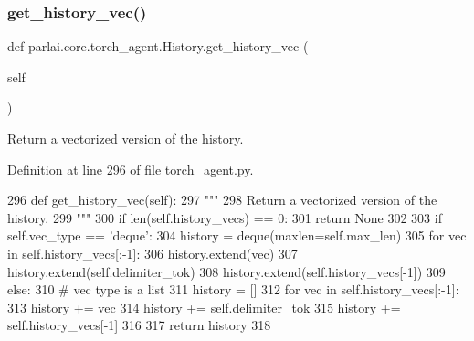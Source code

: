 \subsubsection{\texorpdfstring{get\+\_\+history\+\_\+vec()}{get\_history\_vec()}}
{\footnotesize\ttfamily def parlai.\+core.\+torch\+\_\+agent.\+History.\+get\+\_\+history\+\_\+vec (\begin{DoxyParamCaption}\item[{}]{self }\end{DoxyParamCaption})}

\begin{DoxyVerb}Return a vectorized version of the history.
\end{DoxyVerb}
 

Definition at line 296 of file torch\+\_\+agent.\+py.


\begin{DoxyCode}
296     \textcolor{keyword}{def }get\_history\_vec(self):
297         \textcolor{stringliteral}{"""}
298 \textcolor{stringliteral}{        Return a vectorized version of the history.}
299 \textcolor{stringliteral}{        """}
300         \textcolor{keywordflow}{if} len(self.history\_vecs) == 0:
301             \textcolor{keywordflow}{return} \textcolor{keywordtype}{None}
302 
303         \textcolor{keywordflow}{if} self.vec\_type == \textcolor{stringliteral}{'deque'}:
304             history = deque(maxlen=self.max\_len)
305             \textcolor{keywordflow}{for} vec \textcolor{keywordflow}{in} self.history\_vecs[:-1]:
306                 history.extend(vec)
307                 history.extend(self.delimiter\_tok)
308             history.extend(self.history\_vecs[-1])
309         \textcolor{keywordflow}{else}:
310             \textcolor{comment}{# vec type is a list}
311             history = []
312             \textcolor{keywordflow}{for} vec \textcolor{keywordflow}{in} self.history\_vecs[:-1]:
313                 history += vec
314                 history += self.delimiter\_tok
315             history += self.history\_vecs[-1]
316 
317         \textcolor{keywordflow}{return} history
318 
\end{DoxyCode}
\mbox{\label{classparlai_1_1core_1_1torch__agent_1_1History_a117862fe92da69172cb8e0c494bcd280}} 
